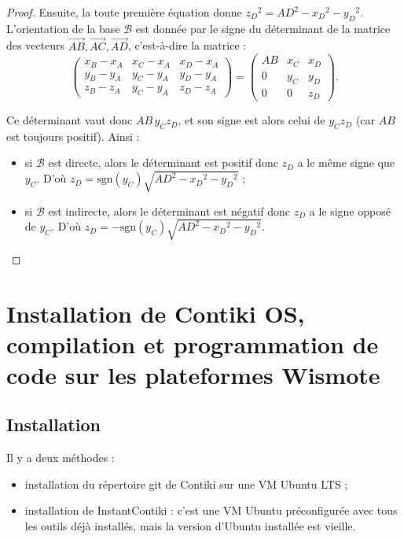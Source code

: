 \documentclass[french, a4paper, 12pt, parskip]{scrartcl}
\begin{document}
\begin{proof}
  Ensuite, la toute première équation donne ${z_D}^2 = {AD}^2 - {x_D}^2 -
  {y_D}^2$. L'orientation de la base $\mathcal{B}$ est donnée par le signe du
  déterminant de la matrice des vecteurs $\overrightarrow{AB},
  \overrightarrow{AC}, \overrightarrow{AD}$, c'est-à-dire la matrice :
  \[
    \begin{pmatrix}
      x_B - x_A & x_C - x_A & x_D - x_A \\
      y_B - y_A & y_C - y_A & y_D - y_A \\
      z_B - z_A & y_C - y_A & z_D - z_A
    \end{pmatrix}
    =
    \begin{pmatrix}
      AB & x_C & x_D \\
      0  & y_C & y_D \\
      0  & 0   & z_D
    \end{pmatrix}.
  \]

  Ce déterminant vaut donc $AB\,y_Cz_D$, et son signe est alors
  celui de $y_Cz_D$ (car $AB$ est toujours positif). Ainsi :
  \begin{itemize}
    \item si $\mathcal{B}$ est directe, alors le déterminant est positif donc
      $z_D$ a le même signe que $y_C$. D'où $\boxed{z_D =
      \mathrm{sgn}(y_C)\sqrt{{AD}^2 - {x_D}^2 - {y_D}^2}}$ ;
    \item si $\mathcal{B}$ est indirecte, alors le déterminant est négatif donc
      $z_D$ a le signe opposé de $y_C$. D'où $\boxed{z_D =
      -\mathrm{sgn}(y_C)\sqrt{{AD}^2 - {x_D}^2 - {y_D}^2}}$.\qedhere
  \end{itemize}
\end{proof}

\section{Installation de Contiki OS, compilation et programmation de code sur les plateformes Wismote}
\label{sec:contiki}

\subsection{Installation}
\label{subsec:contiki-install}

Il y a deux méthodes :
\begin{itemize}
  \item installation du répertoire git de Contiki sur une VM Ubuntu LTS ;
  \item installation de InstantContiki : c'est une VM Ubuntu préconfigurée avec
    tous les outils déjà installés, mais la version d'Ubuntu installée est
    vieille.
\end{itemize}
\end{document}

